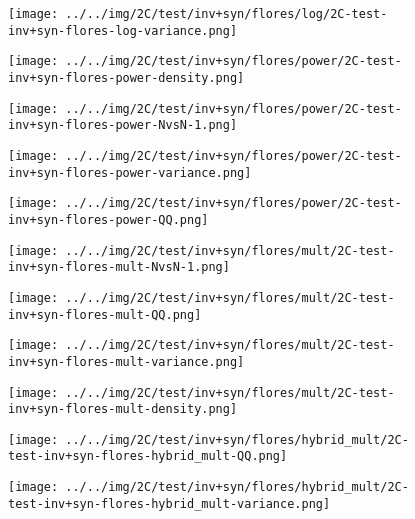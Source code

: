 \begin{figure}[H]
\centering	\texttt{[image: ../../img/2C/test/inv+syn/flores/log/2C-test-inv+syn-flores-log-variance.png]}
\end{figure}
\begin{figure}[H]
\centering	\texttt{[image: ../../img/2C/test/inv+syn/flores/power/2C-test-inv+syn-flores-power-density.png]}
\end{figure}
\begin{figure}[H]
\centering	\texttt{[image: ../../img/2C/test/inv+syn/flores/power/2C-test-inv+syn-flores-power-NvsN-1.png]}
\end{figure}
\begin{figure}[H]
\centering	\texttt{[image: ../../img/2C/test/inv+syn/flores/power/2C-test-inv+syn-flores-power-variance.png]}
\end{figure}
\begin{figure}[H]
\centering	\texttt{[image: ../../img/2C/test/inv+syn/flores/power/2C-test-inv+syn-flores-power-QQ.png]}
\end{figure}
\begin{figure}[H]
\centering	\texttt{[image: ../../img/2C/test/inv+syn/flores/mult/2C-test-inv+syn-flores-mult-NvsN-1.png]}
\end{figure}
\begin{figure}[H]
\centering	\texttt{[image: ../../img/2C/test/inv+syn/flores/mult/2C-test-inv+syn-flores-mult-QQ.png]}
\end{figure}
\begin{figure}[H]
\centering	\texttt{[image: ../../img/2C/test/inv+syn/flores/mult/2C-test-inv+syn-flores-mult-variance.png]}
\end{figure}
\begin{figure}[H]
\centering	\texttt{[image: ../../img/2C/test/inv+syn/flores/mult/2C-test-inv+syn-flores-mult-density.png]}
\end{figure}
\begin{figure}[H]
\centering	\texttt{[image: ../../img/2C/test/inv+syn/flores/hybrid\_mult/2C-test-inv+syn-flores-hybrid\_mult-QQ.png]}
\end{figure}
\begin{figure}[H]
\centering	\texttt{[image: ../../img/2C/test/inv+syn/flores/hybrid\_mult/2C-test-inv+syn-flores-hybrid\_mult-variance.png]}
\end{figure}
